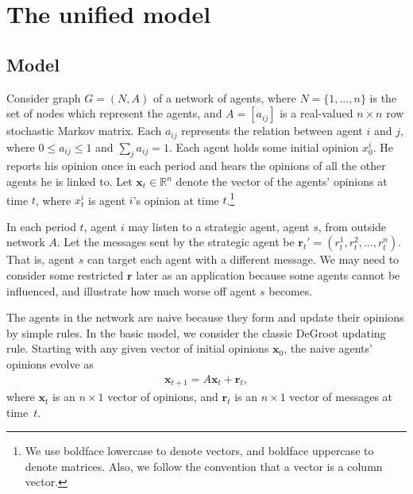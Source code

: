 \documentclass{article}
\newcommand{\x}{\mathbf{x}}
\newcommand{\re}{\mathbf{r}}
\newcommand{\wl}[1]{{\color{blue} #1}}
\begin{document}
\section{The unified model}
\subsection*{Model}
Consider graph $G=(N, A)$ of a network of agents, where $N = \{1,\ldots,n\}$ is the set of nodes which represent the agents, and $A=[a_{ij}]$ is a real-valued $n \times n$ row stochastic Markov matrix. Each $a_{ij}$ represents the relation between agent $i$ and $j$, where $0\leq a_{ij}\leq 1$ and $\sum_j a_{ij}= 1$. 
Each agent holds some initial opinion $x_0^i$. He reports his opinion once in each period and hears the opinions of all the other agents he is linked to. Let $\x_t\in \mathbb{R}^n$ denote the vector of the agents' opinions at time $t$, where $x_t^i$ is agent $i$'s opinion at time $t$.\footnote{We use boldface lowercase to denote vectors, and boldface uppercase to denote matrices. Also, we follow the convention that a vector is a column vector.} 

In each period $t$, agent $i$ may listen to a strategic agent, agent $s$, from outside network $A$. Let the messages sent by the strategic agent be  $\re_t'=(r_t^1,r_t^2,\ldots, r_t^n)$. 
That is, agent $s$ can target each agent with a different message.  \wl{We may need to consider some restricted $\re$ later as an application because some agents cannot be influenced, and illustrate how much worse off agent $s$ becomes.}

The agents in the network are naive because they form and update their opinions by simple rules. In the basic model, we consider the classic DeGroot updating rule. Starting with any given vector of initial opinions $\x_0$, the naive agents' opinions evolve as 
\begin{align}\label{lin-sys}
\x_{t+1} = A\x_t+\re_t,
\end{align}
where $\x_t$ is an $n \times 1$ vector of opinions, and $\re_t$ is an $n \times 1$ vector of messages at time~$t$. 
\end{document}
